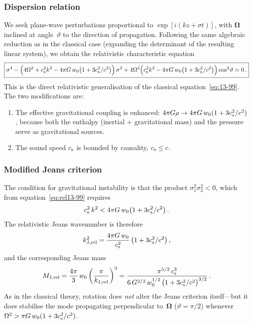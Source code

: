\subsubsection*{Dispersion relation}

We seek plane-wave perturbations proportional to
$\exp[i(kz + \sigma t)]$, with $\boldsymbol{\Omega}$ inclined at
angle~$\vartheta$ to the direction of propagation.  Following the same
algebraic reduction as in the classical case (expanding the determinant
of the resulting linear system), we obtain the relativistic
characteristic equation
\begin{equation}
\boxed{
  \sigma^{4}
  - \Bigl(4\Omega^{2} + c_{\mathrm{s}}^{2}k^{2}
    - 4\pi G\,w_{0}\bigl(1+3c_{\mathrm{s}}^{2}/c^{2}\bigr)
    \Bigr)\,\sigma^{2}
  + 4\Omega^{2}\Bigl(c_{\mathrm{s}}^{2}k^{2}
    - 4\pi G\,w_{0}\bigl(1+3c_{\mathrm{s}}^{2}/c^{2}\bigr)
    \Bigr)\cos^{2}\!\vartheta
  = 0\,.}
  \label{eq:rel13-99}
\end{equation}
This is the direct relativistic generalisation of the classical
equation~\eqref{eq:13-99}.  The two modifications are:
\begin{enumerate}
\item[(i)] The effective gravitational coupling is enhanced:
  $4\pi G\rho \to 4\pi G\,w_{0}(1+3c_{\mathrm{s}}^{2}/c^{2})$, because
  both the enthalpy (inertial + gravitational mass) and the pressure
  serve as gravitational sources.
\item[(ii)] The sound speed $c_{\mathrm{s}}$ is bounded by causality,
  $c_{\mathrm{s}} \le c$.
\end{enumerate}

\subsubsection*{Modified Jeans criterion}

The condition for gravitational instability is that the product
$\sigma_{1}^{2}\sigma_{2}^{2} < 0$, which from
equation~\eqref{eq:rel13-99} requires
\begin{equation}
  c_{\mathrm{s}}^{2}\,k^{2}
  < 4\pi G\,w_{0}\bigl(1 + 3c_{\mathrm{s}}^{2}/c^{2}\bigr)\,.
  \label{eq:rel13-jeans-rot}
\end{equation}
The relativistic Jeans wavenumber is therefore
\begin{equation}
  k_{\mathrm{J,rel}}^{2}
  = \frac{4\pi G\,w_{0}}{c_{\mathrm{s}}^{2}}
    \,\bigl(1 + 3c_{\mathrm{s}}^{2}/c^{2}\bigr)\,,
  \label{eq:rel13-kJ}
\end{equation}
and the corresponding Jeans mass
\begin{equation}
  M_{\mathrm{J,rel}}
  = \frac{4\pi}{3}\,w_{0}
    \left(\frac{\pi}{k_{\mathrm{J,rel}}}\right)^{3}
  = \frac{\pi^{5/2}\,c_{\mathrm{s}}^{3}}{6\,G^{3/2}\,
    w_{0}^{1/2}\,
    \bigl(1+3c_{\mathrm{s}}^{2}/c^{2}\bigr)^{3/2}}\,.
  \label{eq:rel13-MJ}
\end{equation}
As in the classical theory, rotation does \emph{not} alter the Jeans
criterion itself---but it does stabilise the mode propagating
perpendicular to~$\boldsymbol{\Omega}$ ($\vartheta = \pi/2$) whenever
$\Omega^{2} > \pi G\,w_{0}(1+3c_{\mathrm{s}}^{2}/c^{2})$.

